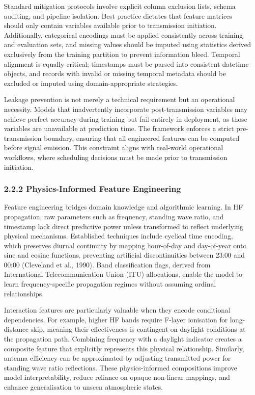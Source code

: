 Standard mitigation protocols involve explicit column exclusion lists,
schema auditing, and pipeline isolation. Best practice dictates that
feature matrices should only contain variables available prior to
transmission initiation. Additionally, categorical encodings must be
applied consistently across training and evaluation sets, and missing
values should be imputed using statistics derived exclusively from the
training partition to prevent information bleed. Temporal alignment is
equally critical; timestamps must be parsed into consistent datetime
objects, and records with invalid or missing temporal metadata should be
excluded or imputed using domain-appropriate strategies.

Leakage prevention is not merely a technical requirement but an
operational necessity. Models that inadvertently incorporate
post-transmission variables may achieve perfect accuracy during training
but fail entirely in deployment, as those variables are unavailable at
prediction time. The framework enforces a strict pre-transmission
boundary, ensuring that all engineered features can be computed before
signal emission. This constraint aligns with real-world operational
workflows, where scheduling decisions must be made prior to transmission
initiation.

\subsubsection{2.2.2 Physics-Informed Feature
Engineering}\label{physics-informed-feature-engineering}

Feature engineering bridges domain knowledge and algorithmic learning.
In HF propagation, raw parameters such as frequency, standing wave
ratio, and timestamp lack direct predictive power unless transformed to
reflect underlying physical mechanisms. Established techniques include
cyclical time encoding, which preserves diurnal continuity by mapping
hour-of-day and day-of-year onto sine and cosine functions, preventing
artificial discontinuities between 23:00 and 00:00 (Cleveland et al.,
1990). Band classification flags, derived from International
Telecommunication Union (ITU) allocations, enable the model to learn
frequency-specific propagation regimes without assuming ordinal
relationships.

Interaction features are particularly valuable when they encode
conditional dependencies. For example, higher HF bands require F-layer
ionisation for long-distance skip, meaning their effectiveness is
contingent on daylight conditions at the propagation path. Combining
frequency with a daylight indicator creates a composite feature that
explicitly represents this physical relationship. Similarly, antenna
efficiency can be approximated by adjusting transmitted power for
standing wave ratio reflections. These physics-informed compositions
improve model interpretability, reduce reliance on opaque non-linear
mappings, and enhance generalisation to unseen atmospheric states.

